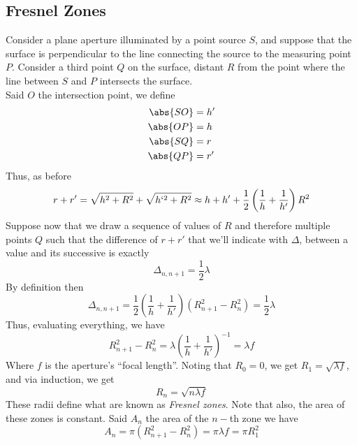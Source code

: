 \documentclass[../electromagnetism.tex]{subfiles}
\begin{document}
\subsection{Fresnel Zones}
Consider a plane aperture illuminated by a point source $S$, and suppose that the surface is perpendicular to the line connecting the source to the measuring point $P$. Consider a third point $Q$ on the surface, distant $R$ from the point where the line between $S$ and $P$ intersects the surface.\\
Said $O$ the intersection point, we define
\begin{equation*}
	\begin{aligned}
		\abs{SO}&= h'\\
		\abs{OP}&= h\\
		\abs{SQ}&= r\\
		\abs{QP}&= r'
	\end{aligned}
\end{equation*}
Thus, as before
\begin{equation*}
	r+r'=\sqrt{h^2+R^2}+\sqrt{h`^2+R^2}\approx h+h'+\frac{1}{2}\left( \frac{1}{h}+\frac{1}{h'} \right)R^2
\end{equation*}
Suppose now that we draw a sequence of values of $R$ and therefore multiple points $Q$ such that the difference of $r+r'$ that we'll indicate with $\Delta$, between a value and its successive is exactly
\begin{equation*}
	\Delta_{n, n+1}=\frac{1}{2}\lambda
\end{equation*}
By definition then
\begin{equation*}
	\Delta_{n, n+1}=\frac{1}{2}\left( \frac{1}{h}+\frac{1}{h'} \right)\left( R^2_{n+1}-R_n^2 \right)=\frac{1}{2}\lambda
\end{equation*}
Thus, evaluating everything, we have
\begin{equation}
	R^2_{n+1}-R^2_{n}=\lambda\left( \frac{1}{h}+\frac{1}{h'} \right)^{-1}=\lambda f
	\label{eq:aperturefocallength.diff}
\end{equation}
Where $f$ is the aperture's ``focal length''. Noting that $R_0=0$, we get $R_1=\sqrt{\lambda f}$, and via induction, we get
\begin{equation}
	R_n=\sqrt{n\lambda f}
	\label{eq:fresnelzones.diff}
\end{equation}
These radii define what are known as \textit{Fresnel zones}. Note that also, the area of these zones is constant. Said $A_n$ the area of the $n-$th zone we have
\begin{equation}
	A_n=\pi\left( R_{n+1}^2-R_n^2 \right)=\pi\lambda f=\pi R_1^2
	\label{eq:fresnelzonesarea.diff}
\end{equation}
\end{document}
